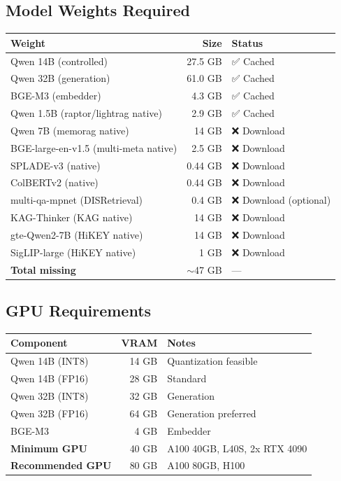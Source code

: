 \documentclass[11pt,a4paper]{article}
\begin{document}
\subsection{Model Weights Required}

\begin{center}
\small
\begin{tabular}{@{}lrl@{}}
\toprule
\textbf{Weight} & \textbf{Size} & \textbf{Status} \\
\midrule
Qwen 14B (controlled) & 27.5 GB & ✅ Cached \\
Qwen 32B (generation) & 61.0 GB & ✅ Cached \\
BGE-M3 (embedder) & 4.3 GB & ✅ Cached \\
Qwen 1.5B (raptor/lightrag native) & 2.9 GB & ✅ Cached \\
Qwen 7B (memorag native) & ~14 GB & ❌ Download \\
BGE-large-en-v1.5 (multi-meta native) & 2.5 GB & ❌ Download \\
SPLADE-v3 (native) & 0.44 GB & ❌ Download \\
ColBERTv2 (native) & 0.44 GB & ❌ Download \\
multi-qa-mpnet (DISRetrieval) & 0.4 GB & ❌ Download (optional) \\
KAG-Thinker (KAG native) & ~14 GB & ❌ Download \\
gte-Qwen2-7B (HiKEY native) & ~14 GB & ❌ Download \\
SigLIP-large (HiKEY native) & ~1 GB & ❌ Download \\
\midrule
\textbf{Total missing} & $\sim$47 GB & --- \\
\bottomrule
\end{tabular}
\end{center}

\subsection{GPU Requirements}

\begin{center}
\small
\begin{tabular}{@{}lrl@{}}
\toprule
\textbf{Component} & \textbf{VRAM} & \textbf{Notes} \\
\midrule
Qwen 14B (INT8) & ~14 GB & Quantization feasible \\
Qwen 14B (FP16) & ~28 GB & Standard \\
Qwen 32B (INT8) & ~32 GB & Generation \\
Qwen 32B (FP16) & ~64 GB & Generation preferred \\
BGE-M3 & ~4 GB & Embedder \\
\midrule
\textbf{Minimum GPU} & 40 GB & A100 40GB, L40S, 2x RTX 4090 \\
\textbf{Recommended GPU} & 80 GB & A100 80GB, H100 \\
\bottomrule
\end{tabular}
\end{center}
\end{document}
